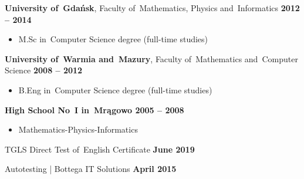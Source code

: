 \documentclass[11pt,a4paper]{article}
\newcommand*\header[1]{
    \noindent\raisebox{.1cm}{\color{MidnightBlue}\rule{1.5cm}{.05cm}\hspace{.2cm}\raisebox{-.1cm}{\large\bf #1}}}
\begin{document}
    \pagebreak
  
    \header{Education}
  
    \medskip

    {{\bf University of~Gdańsk}, Faculty of~Mathematics, Physics and~Informatics \hfill {\bf 2012 -- 2014}}

    \vspace{-.23cm}
    \begin{itemize}[leftmargin=1.5cm] \itemsep.2mm \parskip0mm 
        \item[ ] M.Sc in~Computer Science degree (full-time studies)
    \end{itemize}

    \vspace{-.17cm}

    {{\bf University of~Warmia and~Mazury}, Faculty of~Mathematics and~Computer Science
        \hfill {\bf 2008 -- 2012}}

    \vspace{-.23cm}
    \begin{itemize}[leftmargin=1.5cm] \itemsep.2mm \parskip0mm 
        \item[ ] B.Eng in~Computer Science degree (full-time studies)
    \end{itemize}

    \vspace{-.17cm}

    {\bf High School No~I in~Mrągowo \hfill 2005 -- 2008}

    \vspace{-.23cm}
    \begin{itemize}[leftmargin=1.5cm] \itemsep.2mm \parskip0mm 
        \item[ ] Mathematics-Physics-Informatics
    \end{itemize}


    \medskip

    \header{Additional qualifications}

    \medskip

    {TGLS Direct Test of~English Certificate \hfill {\bf June 2019}}

    {Autotesting | Bottega IT Solutions \hfill {\bf April 2015}}
\end{document}
